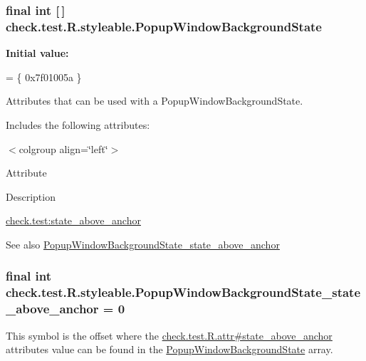 \subsubsection[{Popup\+Window\+Background\+State}]{\setlength{\rightskip}{0pt plus 5cm}final int \mbox{[}$\,$\mbox{]} check.\+test.\+R.\+styleable.\+Popup\+Window\+Background\+State\hspace{0.3cm}{\ttfamily [static]}}\label{classcheck_1_1test_1_1_r_1_1styleable_a63af2b96a7d723f1c8f7cc45982e2b8a}
{\bfseries Initial value\+:}
\begin{DoxyCode}
= \{
            0x7f01005a
        \}
\end{DoxyCode}
Attributes that can be used with a Popup\+Window\+Background\+State. 

Includes the following attributes\+:

\begin{TabularC}{0}
\hline
\end{TabularC}
$<$colgroup align=\char`\"{}left\char`\"{}$>$ 

Attribute

Description 

{\ttfamily \hyperlink{classcheck_1_1test_1_1_r_1_1styleable_a6cd9e13bf18ca382ac3cfc4c03f36520}{check.\+test\+:state\+\_\+above\+\_\+anchor}}

\begin{DoxySeeAlso}{See also}
\hyperlink{classcheck_1_1test_1_1_r_1_1styleable_a6cd9e13bf18ca382ac3cfc4c03f36520}{Popup\+Window\+Background\+State\+\_\+state\+\_\+above\+\_\+anchor} 
\end{DoxySeeAlso}
\hypertarget{classcheck_1_1test_1_1_r_1_1styleable_a6cd9e13bf18ca382ac3cfc4c03f36520}{}
\subsubsection[{Popup\+Window\+Background\+State\+\_\+state\+\_\+above\+\_\+anchor}]{\setlength{\rightskip}{0pt plus 5cm}final int check.\+test.\+R.\+styleable.\+Popup\+Window\+Background\+State\+\_\+state\+\_\+above\+\_\+anchor = 0\hspace{0.3cm}{\ttfamily [static]}}\label{classcheck_1_1test_1_1_r_1_1styleable_a6cd9e13bf18ca382ac3cfc4c03f36520}
This symbol is the offset where the \hyperlink{classcheck_1_1test_1_1_r_1_1attr_a54549315b6f2f0ff9fab6bb732761d35}{check.\+test.\+R.\+attr\#state\+\_\+above\+\_\+anchor} attribute\textquotesingle{}s value can be found in the \hyperlink{classcheck_1_1test_1_1_r_1_1styleable_a63af2b96a7d723f1c8f7cc45982e2b8a}{Popup\+Window\+Background\+State} array.

